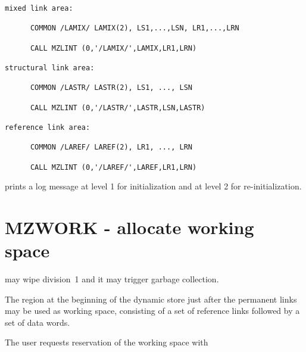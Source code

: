 \Examples

\begin{verbatim}
mixed link area:

      COMMON /LAMIX/ LAMIX(2), LS1,...,LSN, LR1,...,LRN

      CALL MZLINT (0,'/LAMIX/',LAMIX,LR1,LRN)

structural link area:

      COMMON /LASTR/ LASTR(2), LS1, ..., LSN

      CALL MZLINT (0,'/LASTR/',LASTR,LSN,LASTR)

reference link area:

      COMMON /LAREF/ LAREF(2), LR1, ..., LRN

      CALL MZLINT (0,'/LAREF/',LAREF,LR1,LRN)
\end{verbatim} 

 prints a log message at level 1 for initialization
and at level 2 for re-initialization.

\section{MZWORK - allocate working space}
\label{sec:MZWORK}

 may wipe division~1 and it may trigger garbage collection.

The region at the beginning of the dynamic store just after
the permanent links may be used as working space,
consisting of a set of reference links followed by
a set of data words.

The user requests reservation of the working space with



